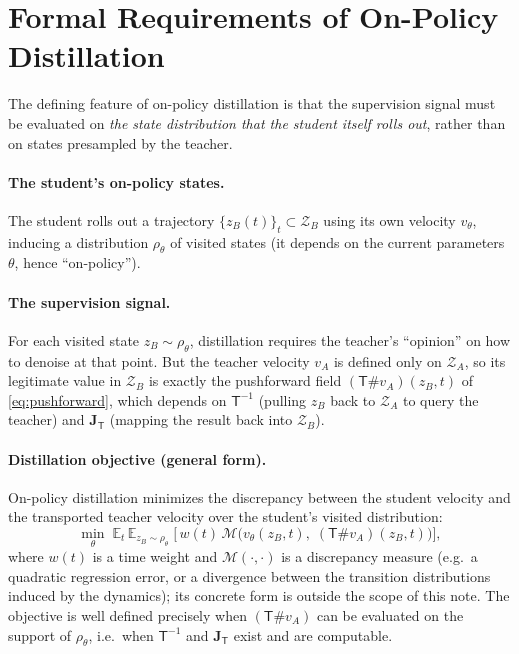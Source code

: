 \documentclass[11pt,a4paper]{article}
\newcommand{\E}{\mathbb{E}}
\newcommand{\Za}{\mathcal{Z}_{A}}
\newcommand{\Zb}{\mathcal{Z}_{B}}
\newcommand{\Tmap}{\mathsf{T}}
\newcommand{\Tinv}{\mathsf{T}^{-1}}
\newcommand{\push}{\#}
\newcommand{\Jac}{\mathbf{J}}
\theoremstyle{definition}
\begin{document}
\section{Formal Requirements of On-Policy Distillation}
\label{sec:onpolicy}

The defining feature of on-policy distillation is that the supervision signal must be evaluated on
\emph{the state distribution that the student itself rolls out}, rather than on states presampled
by the teacher.

\paragraph{The student's on-policy states.}
The student rolls out a trajectory $\{z_B(t)\}_{t}\subset\Zb$ using its own velocity $v_\theta$,
inducing a distribution $\rho_\theta$ of visited states (it depends on the current parameters
$\theta$, hence ``on-policy'').

\paragraph{The supervision signal.}
For each visited state $z_B\sim\rho_\theta$, distillation requires the teacher's ``opinion'' on
how to denoise at that point. But the teacher velocity $v_A$ is defined only on $\Za$, so its
legitimate value in $\Zb$ is exactly the pushforward field $(\Tmap\push v_A)(z_B,t)$ of
\eqref{eq:pushforward}, which depends on $\Tinv$ (pulling $z_B$ back to $\Za$ to query the
teacher) and $\Jac_{\Tmap}$ (mapping the result back into $\Zb$).

\paragraph{Distillation objective (general form).}
On-policy distillation minimizes the discrepancy between the student velocity and the transported
teacher velocity over the student's visited distribution:
\begin{equation}
\min_{\theta}\;
\E_{t}\,\E_{z_B\sim\rho_\theta}\;
\Big[\,w(t)\,
\mathcal{M}\!\Big(v_\theta(z_B,t),\;(\Tmap\push v_A)(z_B,t)\Big)\Big],
\label{eq:distill-objective}
\end{equation}
where $w(t)$ is a time weight and $\mathcal{M}(\cdot,\cdot)$ is a discrepancy measure (e.g.\ a
quadratic regression error, or a divergence between the transition distributions induced by the
dynamics); its concrete form is outside the scope of this note. The objective is well defined
precisely when $(\Tmap\push v_A)$ can be evaluated on the support of $\rho_\theta$, i.e.\ when
$\Tinv$ and $\Jac_{\Tmap}$ exist and are computable.
\end{document}
